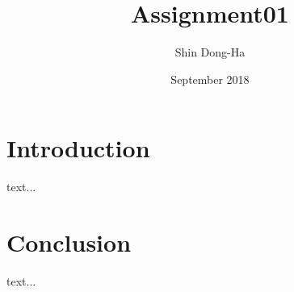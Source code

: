 \documentclass{article}
\title{Assignment01}
\author{Shin Dong-Ha}
\date{September 2018}
\begin{document}
\maketitle

\section{Introduction}
text...


\section{Conclusion}
text... \citep{adams1995hitchhiker}



\end{document}
